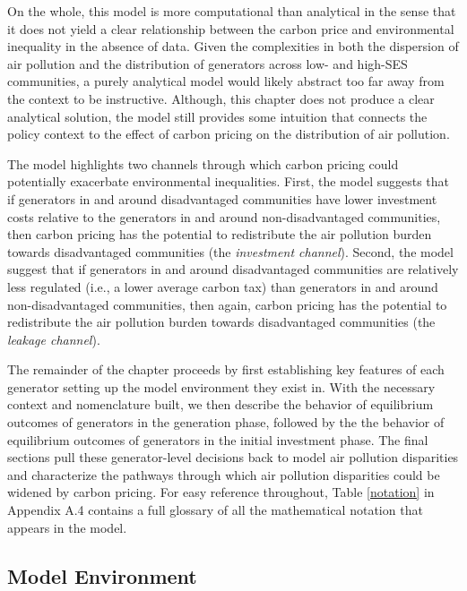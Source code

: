 On the whole, this model is more computational than analytical in the sense that it does not yield a clear relationship between the carbon price and environmental inequality in the absence of data. Given the complexities in both the dispersion of air pollution and the distribution of generators across low- and high-SES communities, a purely analytical model would likely abstract too far away from the context to be instructive. Although, this chapter does not produce a clear analytical solution, the model still provides some intuition that connects the policy context to the effect of carbon pricing on the distribution of air pollution. 

The model highlights two channels through which carbon pricing could potentially exacerbate environmental inequalities. First, the model suggests that if generators in and around disadvantaged communities have lower investment costs relative to the generators in and around non-disadvantaged communities, then carbon pricing has the potential to redistribute the air pollution burden towards disadvantaged communities (the \emph{investment channel}). Second, the model suggest that if generators in and around disadvantaged communities are relatively less regulated (i.e., a lower average carbon tax) than generators in and around non-disadvantaged communities, then again, carbon pricing has the potential to redistribute the air pollution burden towards disadvantaged communities (the \emph{leakage channel}). 


The remainder of the chapter proceeds by first establishing key features of each generator setting up the model environment they exist in. With the necessary context and nomenclature built, we then describe the behavior of equilibrium outcomes of generators in the generation phase, followed by the the behavior of equilibrium outcomes of generators in the initial investment phase. The final sections pull these generator-level decisions back to model air pollution disparities and characterize the pathways through which air pollution disparities could be widened by carbon pricing. For easy reference throughout, Table \ref{notation} in Appendix A.4 contains a full glossary of all the mathematical notation that appears in the model.


\subsection{Model Environment}

